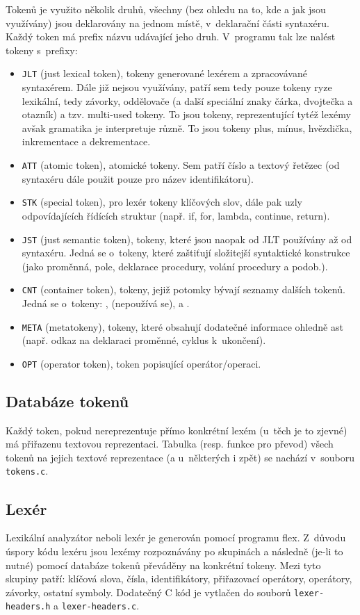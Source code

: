 \documentclass[a4paper,10pt]{article}
\begin{document}
Tokenů je využito několik druhů, všechny (bez ohledu na to, kde a jak jsou využívány) jsou deklarovány na jednom místě, v~deklarační části syntaxéru. Každý token má prefix názvu udávající jeho druh. V~programu tak lze nalést tokeny s~prefixy:
\begin{itemize}
 \item \verb|JLT| (just lexical token), tokeny generované lexérem a zpracovávané syntaxérem. Dále již nejsou využívány, patří sem tedy pouze tokeny ryze lexikální, tedy závorky, oddělovače (a další speciální znaky čárka, dvojtečka a otazník) a tzv. multi-used tokeny. To jsou tokeny, reprezentující tytéž lexémy avšak gramatika je interpretuje různě. To jsou tokeny plus, mínus, hvězdička, inkrementace a dekrementace.
 \item \verb|ATT| (atomic token), atomické tokeny. Sem patří číslo a textový řetězec (od syntaxéru dále použit pouze pro název identifikátoru). 
 \item \verb|STK| (special token), pro lexér tokeny klíčových slov, dále pak uzly odpovídajících řídících struktur (např. if, for, lambda, continue, return).
 \item \verb|JST| (just semantic token), tokeny, které jsou naopak od JLT používány až od syntaxéru. Jedná se o~tokeny, které zaštiťují složitejší syntaktické konstrukce (jako proměnná, pole, deklarace procedury, volání procedury a podob.).
 \item \verb|CNT| (container token), tokeny, jejiž potomky bývají seznamy dalších tokenů. Jedná se o~tokeny: ,  (nepoužívá se),  a . 
 \item \verb|META| (metatokeny), tokeny, které obsahují dodatečné informace ohledně ast (např. odkaz na deklaraci proměnné, cyklus k~ukončení).
  \item \verb|OPT| (operator token), token popisující operátor/operaci.
\end{itemize}

\subsection{Databáze tokenů}
Každý token, pokud nereprezentuje přímo konkrétní lexém (u~těch je to zjevné) má přiřazenu textovou reprezentaci. Tabulka (resp. funkce pro převod) všech tokenů na jejich textové reprezentace (a u~některých i zpět) se nachází v~souboru \verb|tokens.c|.

\subsection{Lexér}
Lexikální analyzátor neboli lexér je generován pomocí programu flex. Z~důvodu úspory kódu lexéru jsou lexémy rozpoznávány po skupinách a následně (je-li to nutné) pomocí databáze tokenů převáděny na konkrétní tokeny. Mezi tyto skupiny patří: klíčová slova, čísla, identifikátory, přiřazovací operátory, operátory, závorky, ostatní symboly. Dodatečný C kód je vytlačen do souborů \verb|lexer-headers.h| a \verb|lexer-headers.c|.
\end{document}
